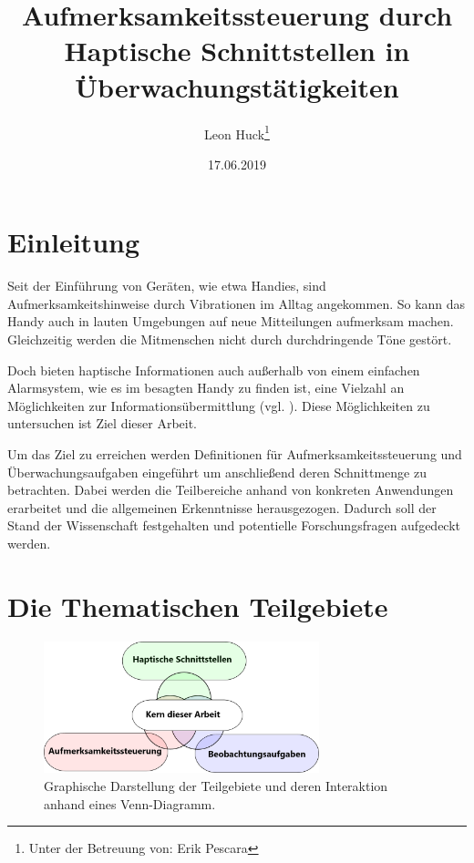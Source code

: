 \documentclass{llncs}					%
\title{Aufmerksamkeitssteuerung durch Haptische Schnittstellen in Überwachungstätigkeiten}
\author{Leon Huck\thanks{Unter der Betreuung von: Erik Pescara}}
\institute{Karlsruher Institut für Technologie}
\date{17.06.2019}
\begin{document}
	
\maketitle

\begin{description}
	\item 
\end{description}

	

\newpage
\tableofcontents
\newpage

\clearpage
\section{Einleitung}

Seit der Einführung von Geräten, wie etwa Handies, sind Aufmerksamkeitshinweise durch Vibrationen im Alltag angekommen. So kann das Handy auch in lauten Umgebungen auf neue Mitteilungen aufmerksam machen. Gleichzeitig werden die Mitmenschen nicht durch durchdringende Töne gestört.

Doch bieten haptische Informationen auch außerhalb von einem einfachen Alarmsystem, wie es im besagten Handy zu finden ist, eine Vielzahl an Möglichkeiten zur Informationsübermittlung (vgl. \cite{10.2307/1705360}). Diese Möglichkeiten zu untersuchen ist Ziel dieser Arbeit.

Um das Ziel zu erreichen werden Definitionen für Aufmerksamkeitssteuerung und Überwachungsaufgaben eingeführt um anschließend deren Schnittmenge zu betrachten. Dabei werden die Teilbereiche anhand von konkreten Anwendungen erarbeitet und die allgemeinen Erkenntnisse herausgezogen.
Dadurch soll der Stand der Wissenschaft festgehalten und potentielle Forschungsfragen aufgedeckt werden.

\clearpage
\section{Die Thematischen Teilgebiete}

\begin{figure}[htbp]
	\begin{center}
		\includegraphics[width = 8cm]{Grafiken/Venn-Diagramm.png}
		\caption{Graphische Darstellung der Teilgebiete und deren Interaktion anhand eines Venn-Diagramm.}
		\label{Venn-Diagramm.png}
	\end{center}
\end{figure}
\end{document}
